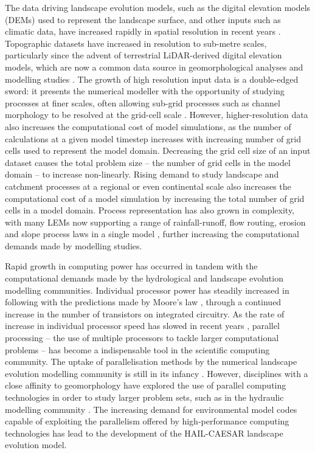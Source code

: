 The data driving landscape evolution models, such as the digital elevation models (DEMs) used to represent the landscape surface, and other inputs such as climatic data, have increased rapidly in spatial resolution in recent years \citep[e.g.,][]{gesch2002national, rabus2003shuttle, tarolli2009understanding, casas2006topographic, krishnan2011opentopography}. Topographic datasets have increased in resolution to sub-metre scales, particularly since the advent of terrestrial LiDAR-derived digital elevation models, which are now a common data source in geomorphological analyses and modelling studies \citep{bates2003optimal, passalacqua2010geometric,clubb2014objective}. The growth of high resolution input data is a double-edged sword: it presents the numerical modeller with the opportunity of studying processes at finer scales, often allowing sub-grid processes such as channel morphology to be resolved at the grid-cell scale \citep{schoorl2000three}. However, higher-resolution data also increases the computational cost of model simulations, as the number of calculations at a given model timestep increases with increasing number of grid cells used to represent the model domain. Decreasing the grid cell size of an input dataset causes the total problem size -- the number of grid cells in the model domain -- to increase non-linearly. Rising demand to study landscape and catchment processes at a regional or even continental scale also increases the computational cost of a model simulation by increasing the total number of grid cells in a model domain. Process representation has also grown in complexity, with many LEMs now supporting a range of rainfall-runoff, flow routing, erosion and slope process laws in a single model \citep{Coulthard2001, Tucker2010, hobley10creative}, further increasing the computational demands made by modelling studies. 

Rapid growth in computing power has occurred in tandem with the computational demands made by the hydrological and landscape evolution modelling communities. Individual processor power has steadily increased in following with the predictions made by Moore's law \citep{schaller1997moore, moore1998cramming}, through a continued increase in the number of transistors on integrated circuitry. As the rate of increase in individual processor speed has slowed in recent years \citep{mann2000end,colwell2013chip}, parallel processing -- the use of multiple processors to tackle larger computational problems --  has become a indispensable tool in the scientific computing community. The uptake of parallelisation methods by the numerical landscape evolution modelling community is still in its infancy \citep{valters2016modelling}. However, disciplines with a close affinity to geomorphology have explored the use of parallel computing technologies in order to study larger problem sets, such as in the hydraulic modelling community \citep[e.g.,][]{ivanov2004catchment, neal2009parallelisation, kollet2010proof, smith2013towards, liang2015high,smith2015towards}. The increasing demand for environmental model codes capable of exploiting the parallelism offered by high-performance computing technologies has lead to the development of the HAIL-CAESAR landscape evolution model. 

